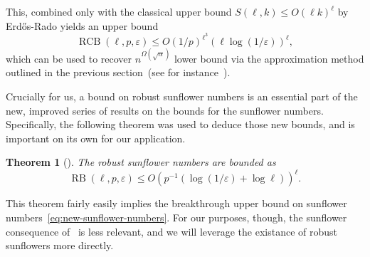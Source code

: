 \documentclass[10pt,a4paper]{article}
\newcommand{\RCB}{\mathop{RCB}}
\newcommand{\RB}{\mathop{RB}}
\newcommand{\ErdosRado}{Erdős-Rado }
\newtheorem{theorem}{Theorem}[section]
\newcommand{\jnote}[1]{\todo[inline,backgroundcolor=blue!20!green]{#1 \\ \textsc{--Jarek}}}
\newcommand{\lnote}[1]{\todo[inline,backgroundcolor=blue!20!yellow]{#1 \\ \textsc{--Linus}}}
\begin{document}
This, combined only with the classical upper bound $S(\ell, k) \leq O(\ell k)^{\ell}$ by \ErdosRado yields an upper bound
\begin{equation*}
    \RCB(\ell, p, \varepsilon) \leq O(1/p)^{\ell^3} (\ell \log(1/\varepsilon))^\ell,
\end{equation*}
which can be used to recover $n^{\Omega(\sqrt{\alpha})}$ lower bound via the approximation method outlined in the previous section~(see for instance~).

Crucially for us, a bound on robust sunflower numbers is an essential part of the new, improved series of results on the bounds for the sunflower numbers. Specifically, the following theorem was used to deduce those new bounds, and is important on its own for our application.

\begin{theorem}[\cite{alweiss20,bell2021note,rao2023sunflowers}]
\label{thm:robust-sunflowers}
    The robust sunflower numbers are bounded as
    \begin{equation*}
        \RB(\ell, p, \varepsilon) \leq O(p^{-1} (\log(1/\varepsilon) + \log \ell) )^{\ell}.
    \end{equation*}
\end{theorem}
This theorem fairly easily implies the breakthrough upper bound on sunflower numbers~\eqref{eq:new-sunflower-numbers}. For our purposes, though, the sunflower consequence of~ is less relevant, and we will leverage the existance of robust sunflowers more directly.
\end{document}
